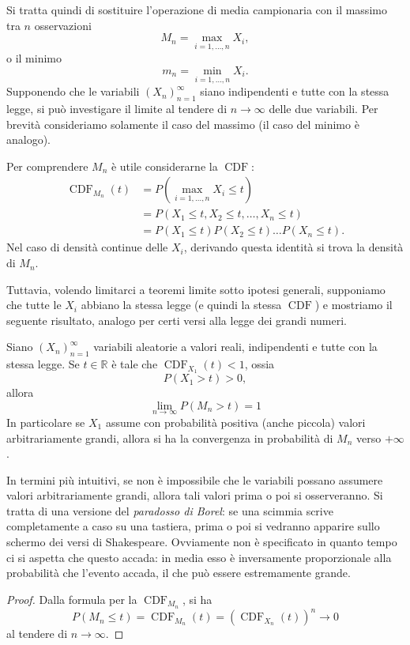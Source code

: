 \documentclass[
  italian,
  letterpaper,
]{book}
\newcommand{\R}{\mathbb{R}}
\newcommand{\CDF}{\operatorname{CDF}}
\theoremstyle{definition}
\theoremstyle{remark}
\begin{document}
Si tratta quindi di sostituire l'operazione di media campionaria con il
massimo tra \(n\) osservazioni \[ M_n = \max_{i=1, \ldots, n} X_i,\] o
il minimo \[ m_n = \min_{i=1, \ldots, n} X_i.\] Supponendo che le
variabili \((X_n)_{n=1}^\infty\) siano indipendenti e tutte con la
stessa legge, si può investigare il limite al tendere di
\(n \to \infty\) delle due variabili. Per brevità consideriamo solamente
il caso del massimo (il caso del minimo è analogo).

Per comprendere \(M_n\) è utile considerarne la \(\CDF\):
\[ \begin{split} \CDF_{M_n}(t) & = P( \max_{i=1, \ldots, n} X_i \le t) \\
& =P( X_1 \le t, X_2 \le t, \ldots, X_n \le t)\\
& = P(X_1 \le t) P(X_2 \le t) \ldots P(X_n \le t).\end{split}\] Nel caso
di densità continue delle \(X_i\), derivando questa identità si trova la
densità di \(M_n\).

Tuttavia, volendo limitarci a teoremi limite sotto ipotesi generali,
supponiamo che tutte le \(X_i\) abbiano la stessa legge (e quindi la
stessa \(\CDF\)) e mostriamo il seguente risultato, analogo per certi
versi alla legge dei grandi numeri.

Siano \((X_n)_{n =1 }^\infty\) variabili aleatorie a valori reali,
indipendenti e tutte con la stessa legge. Se \(t \in \R\) è tale che
\(\CDF_{X_1} (t)<1\), ossia \[ P(X_1 >t) >0,\] allora
\[ \lim_{n \to \infty } P(M_n > t)= 1\] In particolare se \(X_1\) assume
con probabilità positiva (anche piccola) valori arbitrariamente grandi,
allora si ha la convergenza in probabilità di \(M_n\) verso \(+\infty\).

In termini più intuitivi, se non è impossibile che le variabili possano
assumere valori arbitrariamente grandi, allora tali valori prima o poi
si osserveranno. Si tratta di una versione del \emph{paradosso di
Borel}: se una scimmia scrive completamente a caso su una tastiera,
prima o poi si vedranno apparire sullo schermo dei versi di Shakespeare.
Ovviamente non è specificato in quanto tempo ci si aspetta che questo
accada: in media esso è inversamente proporzionale alla probabilità che
l'evento accada, il che può essere estremamente grande.

\begin{proof}
Dalla formula per la \(\CDF_{M_n}\), si ha
\[ P(M_n \le t) =  \CDF_{M_n}(t) = (\CDF_{X_n}(t))^n \to 0\] al tendere
di \(n \to \infty\).
\end{proof}
\end{document}
